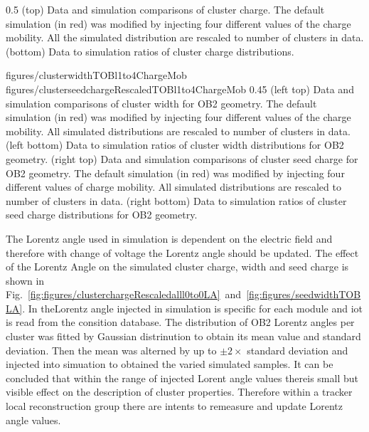                  {0.5}       %
                 { (top) Data and simulation comparisons of cluster charge. The default simulation (in red) was modified by injecting four different values of the charge mobility. All the simulated distribution are rescaled to number of clusters in data. (bottom) Data to simulation ratios of cluster charge distributions. }

                 {figures/clusterwidthTOBl1to4ChargeMob}
                 {figures/clusterseedchargeRescaledTOBl1to4ChargeMob} %
                 {0.45}       %
                 {(left top) Data and simulation  comparisons of cluster width for OB2 geometry. The default simulation (in red) was modified by injecting four different values of the charge mobility. All simulated distributions are rescaled to number of clusters in data. (left bottom) Data to simulation ratios of cluster width distributions for OB2 geometry. (right top) Data and simulation  comparisons of cluster seed charge for OB2 geometry. The default simulation (in red) was modified by injecting four different values of charge mobility. All simulated distributions are rescaled to number of clusters in data. (right bottom) Data to simulation ratios of cluster seed charge distributions for OB2 geometry. }

The Lorentz angle used in simulation is dependent on the electric field and therefore with change of voltage the Lorentz angle should be updated. The effect of the Lorentz Angle on the simulated cluster charge, width and seed charge is shown in Fig.~\ref{fig:figures/clusterchargeRescaledalll0to0LA}~and~\ref{fig:figures/seedwidthTOBLA}. In theLorentz angle injected in simulation is specific for each module and iot is read from the consition database. The distribution of OB2 Lorentz angles per cluster was fitted by Gaussian distrinution to obtain its mean value and standard deviation. Then the mean was alterned by up to $\pm 2 \times$ standard deviation and injected into simuation to obtained the varied simulated samples. It can be concluded that within the range of injected Lorent angle values thereis small but visible effect on the description of cluster properties. Therefore within a tracker local reconstruction group there are intents to remeasure and update Lorentz angle values.


